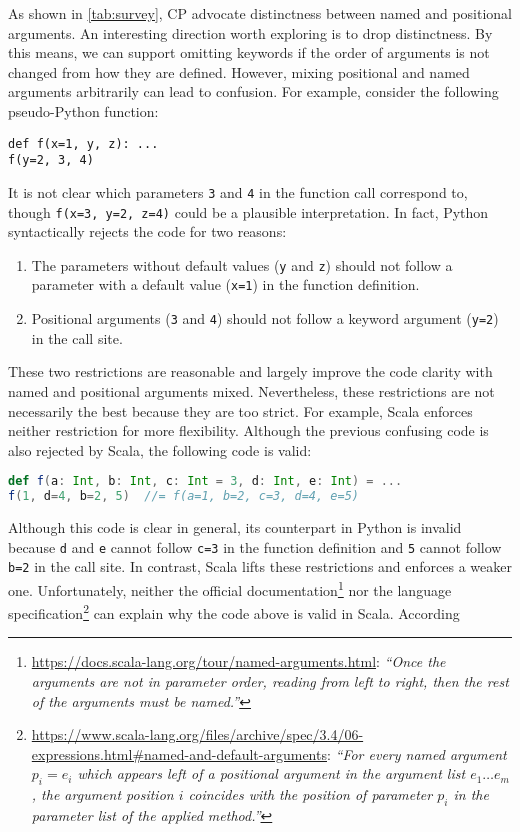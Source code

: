 As shown in \autoref{tab:survey}, CP advocate distinctness between named and
positional arguments. An interesting direction worth exploring is to drop
distinctness. By this means, we can support omitting keywords if the order of
arguments is not changed from how they are defined. However, mixing positional
and named arguments arbitrarily can lead to confusion. For example, consider the
following pseudo-Python function:
\begin{lstlisting}[language={[3]Python}]
def f(x=1, y, z): ...
f(y=2, 3, 4)
\end{lstlisting}
It is not clear which parameters \lstinline{3} and \lstinline{4} in the function
call correspond to, though \lstinline{f(x=3, y=2, z=4)} could be a plausible
interpretation. In fact, Python syntactically rejects the code for two reasons:
\begin{enumerate}
\item The parameters without default values (\lstinline{y} and \lstinline{z})
      should not follow a parameter with a default value (\lstinline{x=1}) in
      the function definition.
\item Positional arguments (\lstinline{3} and \lstinline{4}) should not follow
      a keyword argument (\lstinline{y=2}) in the call site.
\end{enumerate}
These two restrictions are reasonable and largely improve the code clarity with
named and positional arguments mixed. Nevertheless, these restrictions are not
necessarily the best because they are too strict. For example, Scala enforces
neither restriction for more flexibility. Although the previous confusing code
is also rejected by Scala, the following code is valid:
\begin{lstlisting}[language=Scala,otherkeywords={}]
def f(a: Int, b: Int, c: Int = 3, d: Int, e: Int) = ...
f(1, d=4, b=2, 5)  //= f(a=1, b=2, c=3, d=4, e=5)
\end{lstlisting}
Although this code is clear in general, its counterpart in Python is invalid
because \lstinline{d} and \lstinline{e} cannot follow \lstinline{c=3} in the
function definition and \lstinline{5} cannot follow \lstinline{b=2} in the call
site. In contrast, Scala lifts these restrictions and enforces a weaker one.
Unfortunately, neither the official
documentation\footnote{\url{https://docs.scala-lang.org/tour/named-arguments.html}:
\emph{``Once the arguments are not in parameter order, reading from left to
right, then the rest of the arguments must be named.''}} nor the language
specification\footnote{\url{https://www.scala-lang.org/files/archive/spec/3.4/06-expressions.html\#named-and-default-arguments}:
\emph{``For every named argument $p_i = e_i$ which appears left of a positional
argument in the argument list $e_1 \dots e_m$, the argument position $i$
coincides with the position of parameter $p_i$ in the parameter list of the
applied method.''}} can explain why the code above is valid in Scala. According
